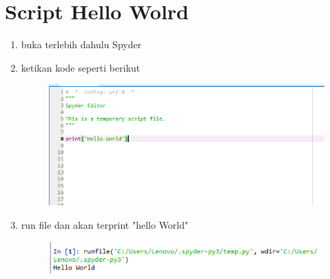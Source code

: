 \chapter*{Script Hello Wolrd}

\begin{enumerate}

	\item buka terlebih dahulu Spyder
	
	\item ketikan kode seperti berikut
	\begin{figure} [h]
	\includegraphics[width=12cm]{section/sp/sp1.png}
	\centering
	\end{figure}
	
	\item run file dan akan terprint "hello World"
	\begin{figure} [h]
	\includegraphics[width=12cm]{section/sp/sp2.png}
	\centering
	\end{figure}
	
	
	
	
\end{enumerate}
